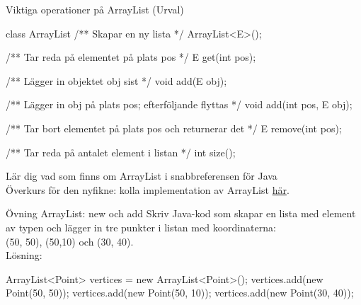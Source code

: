 \begin{Slide}{Viktiga operationer på ArrayList (Urval)}
\begin{JavaSpec}{class ArrayList}
/** Skapar en ny lista */
ArrayList<E>();

/** Tar reda på elementet på plats pos */
E get(int pos);

/** Lägger in objektet obj sist */
void add(E obj);

/** Lägger in obj på plats pos; efterföljande flyttas */
void add(int pos, E obj);

/** Tar bort elementet på plats pos och returnerar det */
E remove(int pos);

/** Tar reda på antalet element i listan */
int size();
\end{JavaSpec}
Lär dig vad som finns om ArrayList i snabbreferensen för Java\\
\SlideFontSmall Överkurs för den nyfikne: kolla implementation av ArrayList \href{http://www.docjar.com/html/api/java/util/ArrayList.java.html}{här}.
\end{Slide}


\begin{Slide}{Övning ArrayList: new och add}
Skriv Java-kod som skapar en lista med element av typen  och lägger in tre punkter i listan med koordinaterna:\\ (50, 50), (50,10) och (30, 40).
\pause
\\\vspace{1em} Lösning: \\\vspace{1em}
\begin{Code}[numberstyle=,language=Java]
ArrayList<Point> vertices = new ArrayList<Point>();
vertices.add(new Point(50, 50));
vertices.add(new Point(50, 10));
vertices.add(new Point(30, 40));
\end{Code}
\end{Slide}


